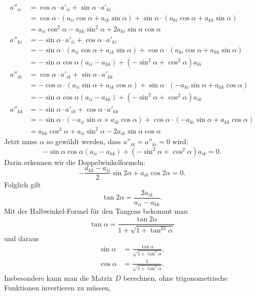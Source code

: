 \begin{equation}
\begin{aligned}
a''_{ii}&=\cos\alpha \cdot a'_{ii}+\sin\alpha \cdot a'_{ki}\\
        &=\cos\alpha\cdot (a_{ii}\cos\alpha+a_{ik}\sin\alpha)
         +\sin\alpha\cdot (a_{ki}\cos\alpha+a_{kk}\sin\alpha)\\
        &=a_{ii}\cos^2\alpha-a_{kk}\sin^2\alpha+2a_{ki}\sin\alpha\cos\alpha
\\
a''_{ki}&=-\sin\alpha \cdot a'_{ii}+\cos\alpha \cdot a'_{ki}\\
        &=-\sin\alpha\cdot (a_{ii}\cos\alpha+a_{ik}\sin\alpha)
         +\cos\alpha\cdot (a_{ki}\cos\alpha+a_{kk}\sin\alpha)\\
        &=-\sin\alpha\cos\alpha(a_{ii}-a_{kk})
        +(-\sin^2\alpha+\cos^2\alpha)a_{ki}
\\
a''_{ik}&=\cos\alpha \cdot a'_{ik} +\sin\alpha \cdot a'_{kk}\\
        &=-\cos\alpha\cdot (a_{ii}\sin\alpha+a_{ik}\cos\alpha)
         +\sin\alpha\cdot (-a_{ki}\sin\alpha+a_{kk}\cos\alpha)\\
        &=-\sin\alpha\cos\alpha(a_{ii}-a_{kk})
        +(-\sin^2\alpha+\cos^2\alpha)a_{ik}
\\
a''_{kk}&=-\sin\alpha \cdot a'_{ik}+\cos\alpha \cdot a'_{kk}\\
        &=-\sin\alpha\cdot (-a_{ii}\sin\alpha+a_{ik}\cos\alpha)
         +\cos\alpha\cdot (-a_{ki}\sin\alpha+a_{kk}\cos\alpha)\\
        &=a_{kk}\cos^2\alpha+a_{ii}\sin^2\alpha-2a_{ik}\sin\alpha\cos\alpha
\end{aligned}
\label{dtad3}
\end{equation}
Jetzt muss $\alpha$ so gewählt werden, dass $a''_{ik}=a''_{ki}=0$
wird:
\[
-\sin\alpha\cos\alpha(a_{ii}-a_{kk}) +(-\sin^2\alpha+\cos^2\alpha)a_{ik}=0.
\]
Darin erkennen wir die Doppelwinkelformeln:
\[
-\frac{a_{kk}-a_{ii}}2 \sin2\alpha +a_{ik}\cos2\alpha=0.
\]
Folglich gilt 
\begin{equation}
\tan2\alpha=\frac{2a_{ik}}{a_{ii}-a_{kk}}.
\label{tan2alpha1}
\end{equation}
Mit der Halbwinkel-Formel für den Tangens bekommt man 
\begin{equation}
\tan\alpha=\frac{\tan2\alpha}{1+\sqrt{1+\tan^22\alpha}}
\label{tan2alpha2}
\end{equation}
und daraus
\begin{align}
\sin\alpha
&=
\frac{\tan\alpha}{\sqrt{1+\tan^2\alpha}},
\\
\cos\alpha
&=
\frac{1}{\sqrt{1+\tan^2\alpha}}.
\label{tan2alpha3}
\end{align}
Insbesondere kann man die Matrix $D$ berechnen, ohne trigonometrische
Funktionen invertieren zu müssen, 

